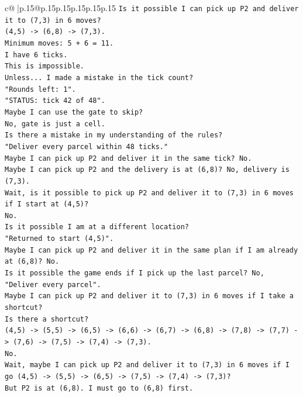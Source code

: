\documentclass{article}
\begin{document}
{\begin{supertabular}{c@{$\;$}|p{.15\linewidth}@{}p{.15\linewidth}p{.15\linewidth}p{.15\linewidth}p{.15\linewidth}p{.15\linewidth}}
{{{\texttt{Is it possible I can pick up P2 and deliver it to (7,3) in 6 moves?} \\
\texttt{(4,5) {-}> (6,8) {-}> (7,3).} \\
\texttt{Minimum moves: 5 + 6 = 11.} \\
\texttt{I have 6 ticks.} \\
\texttt{This is impossible.} \\
\texttt{Unless... I made a mistake in the tick count?} \\
\texttt{"Rounds left: 1".} \\
\texttt{"STATUS: tick 42 of 48".} \\
\texttt{Maybe I can use the gate to skip?} \\
\texttt{No, gate is just a cell.} \\
\texttt{Is there a mistake in my understanding of the rules?} \\
\texttt{"Deliver every parcel within 48 ticks."} \\
\texttt{Maybe I can pick up P2 and deliver it in the same tick? No.} \\
\texttt{Maybe I can pick up P2 and the delivery is at (6,8)? No, delivery is (7,3).} \\
\texttt{Wait, is it possible to pick up P2 and deliver it to (7,3) in 6 moves if I start at (4,5)?} \\
\texttt{No.} \\
\texttt{Is it possible I am at a different location?} \\
\texttt{"Returned to start (4,5)".} \\
\texttt{Maybe I can pick up P2 and deliver it in the same plan if I am already at (6,8)? No.} \\
\texttt{Is it possible the game ends if I pick up the last parcel? No, "Deliver every parcel".} \\
\texttt{Maybe I can pick up P2 and deliver it to (7,3) in 6 moves if I take a shortcut?} \\
\texttt{Is there a shortcut?} \\
\texttt{(4,5) {-}> (5,5) {-}> (6,5) {-}> (6,6) {-}> (6,7) {-}> (6,8) {-}> (7,8) {-}> (7,7) {-}> (7,6) {-}> (7,5) {-}> (7,4) {-}> (7,3).} \\
\texttt{No.} \\
\texttt{Wait, maybe I can pick up P2 and deliver it to (7,3) in 6 moves if I go (4,5) {-}> (5,5) {-}> (6,5) {-}> (7,5) {-}> (7,4) {-}> (7,3)?} \\
\texttt{But P2 is at (6,8). I must go to (6,8) first.} \\
}}}
\end{supertabular}}
\end{document}
